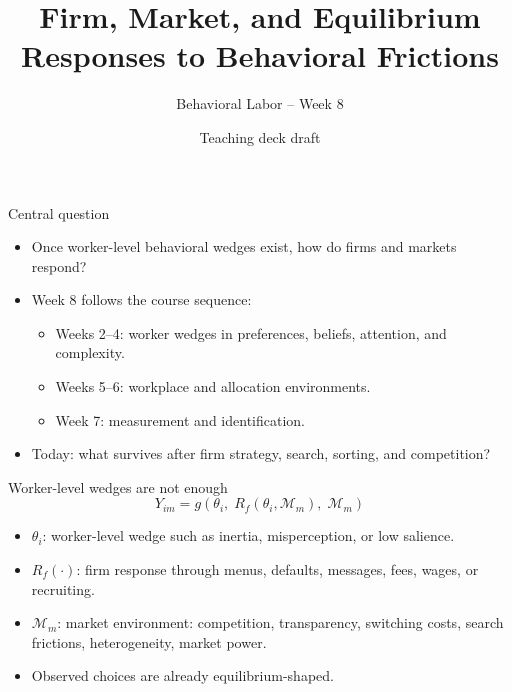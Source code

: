 \documentclass[aspectratio=169,11pt]{beamer}
\title{Firm, Market, and Equilibrium Responses to Behavioral Frictions}
\subtitle{Behavioral Labor -- Week 8}
\author{Teaching deck draft}
\date{}
\begin{document}
\begin{frame}
  \titlepage
\end{frame}

\begin{frame}{Central question}
\begin{itemize}
    \item Once worker-level behavioral wedges exist, how do firms and markets respond?
    \item Week 8 follows the course sequence:
    \begin{itemize}
        \item Weeks 2--4: worker wedges in preferences, beliefs, attention, and complexity.
        \item Weeks 5--6: workplace and allocation environments.
        \item Week 7: measurement and identification.
    \end{itemize}
    \item Today: what survives after firm strategy, search, sorting, and competition?
\end{itemize}
\end{frame}

\begin{frame}{Worker-level wedges are not enough}
\[
Y_{im}=g\!\left(\theta_i,\;R_f(\theta_i,\mathcal{M}_m),\;\mathcal{M}_m\right)
\]

\begin{itemize}
    \item $\theta_i$: worker-level wedge such as inertia, misperception, or low salience.
    \item $R_f(\cdot)$: firm response through menus, defaults, messages, fees, wages, or recruiting.
    \item $\mathcal{M}_m$: market environment: competition, transparency, switching costs, search frictions, heterogeneity, market power.
    \item Observed choices are already equilibrium-shaped.
\end{itemize}
\end{frame}
\end{document}
